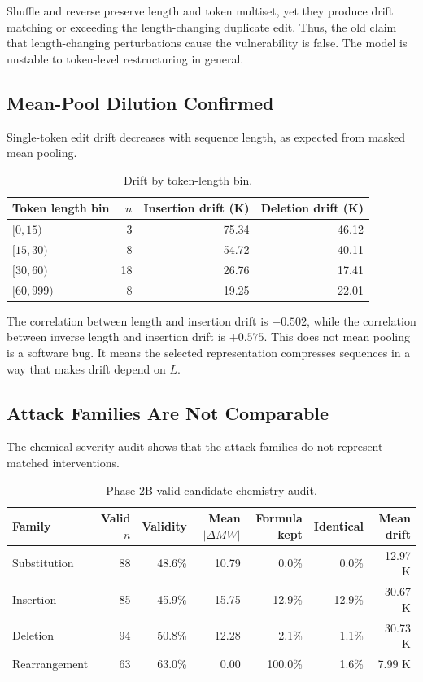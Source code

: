 \documentclass[11pt]{article}
\begin{document}
Shuffle and reverse preserve length and token multiset, yet they produce drift
matching or exceeding the length-changing duplicate edit. Thus, the old claim
that length-changing perturbations cause the vulnerability is false. The model
is unstable to token-level restructuring in general.

\subsection{Mean-Pool Dilution Confirmed}

Single-token edit drift decreases with sequence length, as expected from masked
mean pooling.

\begin{table}[H]
\centering
\caption{Drift by token-length bin.}
\begin{tabular}{@{}lrrr@{}}
\toprule
Token length bin & $n$ & Insertion drift (K) & Deletion drift (K) \\
\midrule
$[0,15)$ & 3 & 75.34 & 46.12 \\
$[15,30)$ & 8 & 54.72 & 40.11 \\
$[30,60)$ & 18 & 26.76 & 17.41 \\
$[60,999)$ & 8 & 19.25 & 22.01 \\
\bottomrule
\end{tabular}
\end{table}

The correlation between length and insertion drift is $-0.502$, while the
correlation between inverse length and insertion drift is $+0.575$. This does
not mean pooling is a software bug. It means the selected representation
compresses sequences in a way that makes drift depend on $L$.

\subsection{Attack Families Are Not Comparable}

The chemical-severity audit shows that the attack families do not represent
matched interventions.

\begin{table}[H]
\centering
\caption{Phase 2B valid candidate chemistry audit.}
\begin{tabularx}{\textwidth}{@{}lrrrrrr@{}}
\toprule
Family & Valid $n$ & Validity & Mean $|\Delta MW|$ & Formula kept & Identical & Mean drift \\
\midrule
Substitution & 88 & 48.6\% & 10.79 & 0.0\% & 0.0\% & 12.97 K \\
Insertion & 85 & 45.9\% & 15.75 & 12.9\% & 12.9\% & 30.67 K \\
Deletion & 94 & 50.8\% & 12.28 & 2.1\% & 1.1\% & 30.73 K \\
Rearrangement & 63 & 63.0\% & 0.00 & 100.0\% & 1.6\% & 7.99 K \\
\bottomrule
\end{tabularx}
\end{table}
\end{document}
